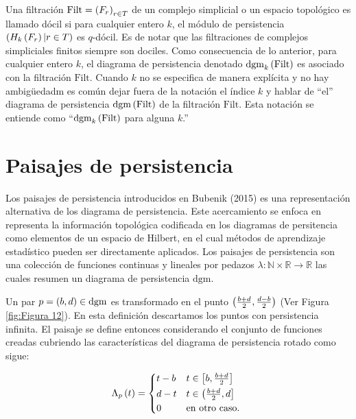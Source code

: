 Una filtraci\'on $\mathrm{Filt}=\left(F_{r}\right)_{r\in T}$ de un complejo simplicial
o un espacio topol\'ogico es llamado d\'ocil si para cualquier entero $k$,
el m\'odulo de persistencia $\left(H_{k}\left(F_{r}\right)|r\in T\right)$ es $q$-d\'ocil.
Es de notar que las filtraciones de complejos simpliciales finitos siempre son dociles.
Como consecuencia de lo anterior, para cualquier entero $k$,
el diagrama de persistencia denotado $\mathrm{dgm}_{k}\left(\mathrm{Filt}\right)$
es asociado con la filtraci\'on $\mathrm{Filt}$.
Cuando $k$ no se especifica de manera expl\'icita y no hay ambig\"uedadm
es com\'un dejar fuera de la notaci\'on el \'indice $k$ y hablar de ``el''
diagrama de persistencia $\mathrm{dgm}\left(\mathrm{Filt}\right)$ de la filtraci\'on $\mathrm{Filt}$.
Esta notaci\'on se entiende como
``$\mathrm{dgm}_{k}\left(\mathrm{Filt}\right)$ para alguna $k$.''

\section{Paisajes de persistencia}

Los paisajes de persistencia introducidos en Bubenik (2015) \cite{Bubenik2015}
es una representaci\'on alternativa de los diagrama de persistencia.
Este acercamiento se enfoca en representa la informaci\'on topol\'ogica
codificada en los diagramas de persitencia como elementos de un espacio de Hilbert,
en el cual m\'etodos de aprendizaje estad\'istico pueden ser directamente aplicados.
Los paisajes de persistencia son una colecci\'on de funciones continuas y lineales
por pedazos $\lambda:\mathbb{N}\times\mathbb{R}\rightarrow\mathbb{R}$
las cuales resumen un diagrama de persistencia $\mathrm{dgm}$.

Un par $p=\left(b,d\right)\in\mathrm{dgm}$ es transformado en el punto
$\left(\frac{b+d}{2},\frac{d-b}{2}\right)$ (Ver Figura \ref{fig:Figura 12}).
En esta definici\'on descartamos los puntos con persistencia infinita.
El paisaje se define entonces considerando el conjunto de funciones creadas
cubriendo las caracter\'isticas del diagrama de persistencia rotado como sigue:

\begin{equation*}
    \Lambda_{p}\cpar{t} =
    \begin{cases*}
        t-b & $t\in\ccorch{b,\frac{b+d}{2}}$ \\
        d-t & $t\in\left(\frac{b+d}{2},d\right]$ \\
        0 & en otro caso.
    \end{cases*}
\end{equation*}

